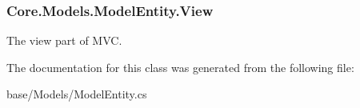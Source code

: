\subsubsection[{View}]{ Core.\+Models.\+Model\+Entity.\+View}\label{classCore_1_1Models_1_1ModelEntity_a19619acbb856f7b54c971b38f061509c}


The view part of M\+V\+C. 



The documentation for this class was generated from the following file\+:\begin{DoxyCompactItemize}
\item 
base/\+Models/Model\+Entity.\+cs\end{DoxyCompactItemize}

